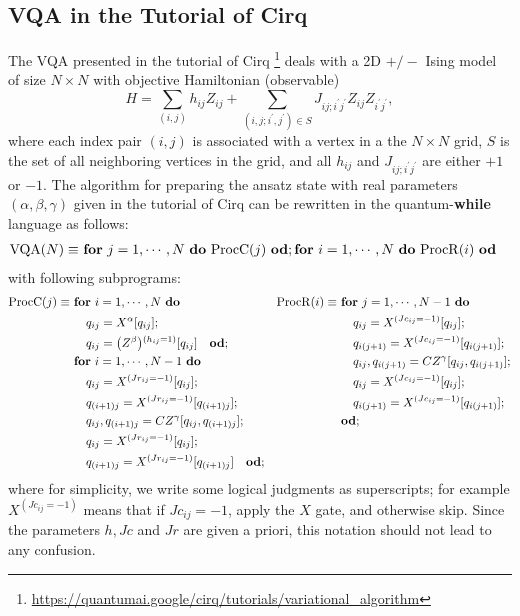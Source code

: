 \documentclass[conference,compsoc, 10pt]{IEEEtran}
\begin{document}
\begin{appendices}
		\subsection{VQA in the Tutorial of Cirq}
		\label{sec app sub VQA in the Tutorial of Cirq}
		
		The VQA presented in the tutorial of Cirq \footnote{\url{https://quantumai.google/cirq/tutorials/variational_algorithm}} deals with a 2D $+/-$ Ising model of size $N\times N$ with objective Hamiltonian (observable)
		$$H = \sum_{(i,j)}h_{ij}Z_{ij} + \sum_{(i,j;i^\prime,j^\prime)\in S}J_{ij;i^\prime j^\prime}Z_{ij}Z_{i^\prime j^\prime},$$
		where each index pair $(i,j)$ is associated with a vertex in a the $N\times N$ grid, $S$ is the set of all neighboring vertices in the grid, and all $h_{ij}$ and $J_{ij;i^\prime j^\prime}$ are either $+1$ or $-1$.
		The algorithm for preparing the ansatz state with real parameters $(\alpha,\beta,\gamma)$ given in the tutorial of Cirq can be rewritten in the quantum-{\bf while} language as follows:
		\begin{align*}
		{\rm VQA}(N)\equiv\ &{\bf for\ } j = 1,\cdots,N {\bf\ do}\ {\rm ProcC}(j)\ {\bf od};
		{\bf for\ } i = 1,\cdots,N {\bf\ do}\ {\rm ProcR}(i)\ {\bf od}
		\end{align*}
		with following subprograms:
		\begin{align*} 
		{\rm ProcC}(j)\equiv\ &{\bf for\ } i = 1,\cdots,N {\bf\ do} & {\rm ProcR}(i)\equiv\ &{\bf for\ } j = 1,\cdots,N-1 {\bf\ do} \\		
		&\quad q_{ij} = X^\alpha[q_{ij}]; & &\quad q_{ij} = X^{(Jc_{ij} = -1)}[q_{ij}]; \\		
		&\quad q_{ij} = \big(Z^\beta\big){}^{(h_{ij} = 1)}[q_{ij}] \quad {\bf od}; & &\quad q_{i(j+1)} = X^{(Jc_{ij} = -1)}[q_{i(j+1)}];\\		
		&{\bf for\ } i = 1,\cdots,N-1 {\bf\ do} & &\quad q_{ij},q_{i(j+1)} = CZ^\gamma[q_{ij},q_{i(j+1)}]; \\		
		&\quad q_{ij} = X^{(Jr_{ij} = -1)}[q_{ij}]; & &\quad q_{ij} = X^{(Jc_{ij} = -1)}[q_{ij}]; \\		
		&\quad q_{(i+1)j} = X^{(Jr_{ij} = -1)}[q_{(i+1)j}]; & &\quad q_{i(j+1)} = X^{(Jc_{ij} = -1)}[q_{i(j+1)}]; \\		
		&\quad q_{ij},q_{(i+1)j} = CZ^\gamma[q_{ij},q_{(i+1)j}]; & &{\bf od}; \\		
		&\quad q_{ij} = X^{(Jr_{ij} = -1)}[q_{ij}]; & &\\		
		&\quad q_{(i+1)j} = X^{(Jr_{ij} = -1)}[q_{(i+1)j}] \quad {\bf od}; & &
		\end{align*}
		where for simplicity, we write some logical judgments as superscripts; for example  $X^{(Jc_{ij} = -1)}$ means that if $Jc_{ij}=-1$, apply the $X$ gate, and otherwise skip. Since the parameters $h, Jc$ and $Jr$ are given a priori, this notation should not lead to any confusion. 
		

\end{appendices}
\end{document}
